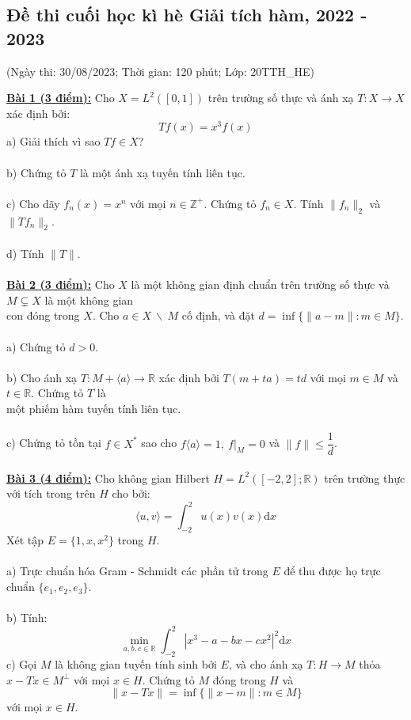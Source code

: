 \documentclass[10pt, a4paper]{article}
\begin{document}
\newpage

\subsection{Đề thi cuối học kì hè Giải tích hàm, 2022 - 2023}
\begin{center}
	\color{blue}(Ngày thi: 30/08/2023; Thời gian: 120 phút; Lớp: 20TTH\_HE)
\end{center}
\color{red}\underline{\textbf{Bài 1 (3 điểm):}} \color{black}Cho $X=L^2([0,1])$ trên trường số thực và ánh xạ $T:X\to X$ xác định bởi: $$Tf(x)=x^3f(x)$$
\color{red}a) \color{black}Giải thích vì sao $Tf\in X$?\\\\
\color{red}b) \color{black}Chứng tỏ $T$ là một ánh xạ tuyến tính liên tục.\\\\
\color{red}c) \color{black}Cho dãy $f_n(x)=x^n$ với mọi $n\in\mathbb Z^+$. Chứng tỏ $f_n\in X$. Tính $\lVert f_n\rVert_2$ và $\lVert Tf_n\rVert_2$.\\\\
\color{red}d) \color{black}Tính $\lVert T\rVert$.\\\\
\color{red}\underline{\textbf{Bài 2 (3 điểm):}} \color{black}Cho $X$ là một không gian định chuẩn trên trường số thực và $M\subsetneq X$ là một không gian\\ con đóng trong $X$. Cho $a\in X~\backslash~M$ cố định, và đặt $d=\inf\{\lVert a-m\rVert:m\in M\}$.\\\\
\color{red}a) \color{black}Chứng tỏ $d>0$.\\\\
\color{red}b) \color{black}Cho ánh xạ $T:M+\langle a\rangle\to\mathbb R$ xác định bởi $T(m+ta)=td$ với mọi $m\in M$ và $t\in\mathbb R$. Chứng tỏ $T$ là\\ một phiếm hàm tuyến tính liên tục.\\\\
\color{red}c) \color{black}Chứng tỏ tồn tại $f\in X^*$ sao cho $f\langle a\rangle=1,~f\big|_M=0$ và $\lVert f\rVert\le\dfrac1d$.\\\\
\color{red}\underline{\textbf{Bài 3 (4 điểm):}} \color{black}Cho không gian Hilbert $H=L^2([-2,2];\mathbb R)$ trên trường thực với tích trong trên $H$ cho bởi: $$\langle u,v\rangle=\displaystyle\int_{-2}^2u(x)v(x)\text{d}x$$
Xét tập $E=\{1,x,x^2\}$ trong $H$.\\\\
\color{red}a) \color{black}Trực chuẩn hóa Gram - Schmidt các phần tử trong $E$ để thu được họ trực chuẩn $\{e_1,e_2,e_3\}$.\\\\
\color{red}b) \color{black}Tính: $$\displaystyle\min_{a,b,c\in\mathbb R}\displaystyle\int_{-2}^2\left|x^3-a-bx-cx^2\right|^2\text{d}x$$
\color{red}c) \color{black}Gọi $M$ là không gian tuyến tính sinh bởi $E$, và cho ánh xạ $T:H\to M$ thỏa $x-Tx\in M^\perp$ với mọi $x\in H$. Chứng tỏ $M$ đóng trong $H$ và $$\lVert x-Tx\rVert=\inf\{\lVert x-m\rVert:m\in M\}$$
với mọi $x\in H$.
\end{document}
